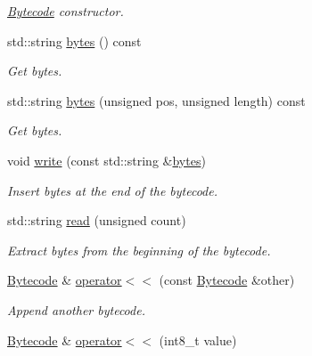 \begin{DoxyCompactItemize}
\begin{DoxyCompactList}\small\item\em {\ttfamily \hyperlink{classcreek_1_1_bytecode}{Bytecode}} constructor. \end{DoxyCompactList}\item 
std\+::string \hyperlink{classcreek_1_1_bytecode_a79f346e111024b762d946db5587bc2a3}{bytes} () const \hypertarget{classcreek_1_1_bytecode_a79f346e111024b762d946db5587bc2a3}{}\label{classcreek_1_1_bytecode_a79f346e111024b762d946db5587bc2a3}

\begin{DoxyCompactList}\small\item\em Get bytes. \end{DoxyCompactList}\item 
std\+::string \hyperlink{classcreek_1_1_bytecode_a3cf9c60ac79c33b9a1376345a556be89}{bytes} (unsigned pos, unsigned length) const 
\begin{DoxyCompactList}\small\item\em Get bytes. \end{DoxyCompactList}\item 
void \hyperlink{classcreek_1_1_bytecode_aacfff9134215a123c4af0364799e1fd4}{write} (const std\+::string \&\hyperlink{classcreek_1_1_bytecode_a79f346e111024b762d946db5587bc2a3}{bytes})\hypertarget{classcreek_1_1_bytecode_aacfff9134215a123c4af0364799e1fd4}{}\label{classcreek_1_1_bytecode_aacfff9134215a123c4af0364799e1fd4}

\begin{DoxyCompactList}\small\item\em Insert bytes at the end of the bytecode. \end{DoxyCompactList}\item 
std\+::string \hyperlink{classcreek_1_1_bytecode_a97100bc6b3de2fc6632739ce27c8a1f8}{read} (unsigned count)
\begin{DoxyCompactList}\small\item\em Extract bytes from the beginning of the bytecode. \end{DoxyCompactList}\item 
\hyperlink{classcreek_1_1_bytecode}{Bytecode} \& \hyperlink{classcreek_1_1_bytecode_a0cee39f9534521bcd2484cf9bd992222}{operator$<$$<$} (const \hyperlink{classcreek_1_1_bytecode}{Bytecode} \&other)\hypertarget{classcreek_1_1_bytecode_a0cee39f9534521bcd2484cf9bd992222}{}\label{classcreek_1_1_bytecode_a0cee39f9534521bcd2484cf9bd992222}

\begin{DoxyCompactList}\small\item\em Append another bytecode. \end{DoxyCompactList}\item 
\hyperlink{classcreek_1_1_bytecode}{Bytecode} \& \hyperlink{classcreek_1_1_bytecode_a1e1b0a5b6c36b3946f430d908e9f5a98}{operator$<$$<$} (int8\+\_\+t value)\hypertarget{classcreek_1_1_bytecode_a1e1b0a5b6c36b3946f430d908e9f5a98}{}\label{classcreek_1_1_bytecode_a1e1b0a5b6c36b3946f430d908e9f5a98}


\end{DoxyCompactItemize}

